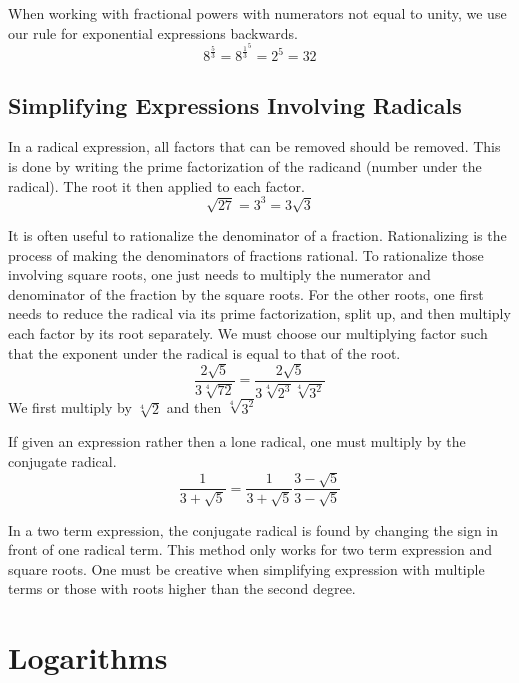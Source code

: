 When working with fractional powers with numerators not equal to unity, we use our rule for exponential expressions backwards. $$ 8^{\frac{5}{3}} = 8^{\frac{1}{3}}^5 = 2^5 = 32 $$

\subsection*{Simplifying Expressions Involving Radicals}

In a radical expression, all factors that can be removed should be removed. This is done by writing the prime factorization of the radicand (number under the radical). The root it then applied to each factor. $$ \sqrt{27} = 3^3 = 3 \sqrt{3}$$

It is often useful to rationalize the denominator of a fraction. Rationalizing is the process of making the denominators of fractions rational. To rationalize those involving square roots, one just needs to multiply the numerator and denominator of the fraction by the square roots. For the other roots, one first needs to reduce the radical via its prime factorization, split up, and then multiply each factor by its root separately. We must choose our multiplying factor such that the exponent under the radical is equal to that of the root. $$ \frac{2 \sqrt{5}}{3 \sqrt[4]{72}} = \frac{2 \sqrt{5}}{3 \sqrt[4]{2^3} \sqrt[4]{3^2}} $$ We first multiply by $ \sqrt[4]{2}$ and then $\sqrt[4]{3^2}$

If given an expression rather then a lone radical, one must multiply by the conjugate radical. $$\frac{1}{3 + \sqrt{5}} = \frac{1}{3 + \sqrt{5}} \frac{3 - \sqrt{5}}{3 - \sqrt{5}}$$

In a two term expression, the conjugate radical is found by changing the sign in front of one radical term. This method only works for two term expression and square roots. One must be creative when simplifying expression with multiple terms or those with roots higher than the second degree.

\section*{Logarithms}


